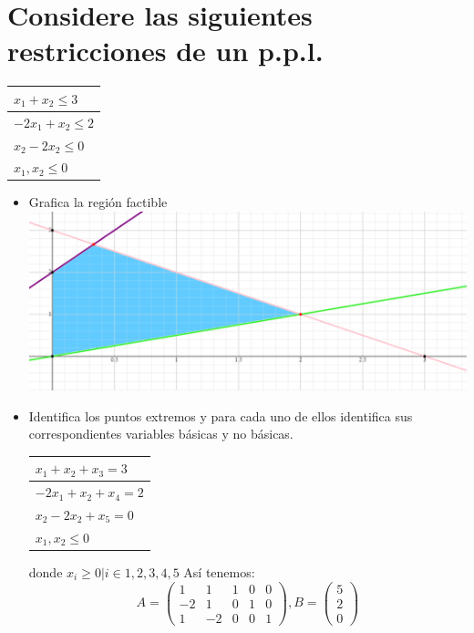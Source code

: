 \section{Considere las siguientes restricciones de un p.p.l.}
\begin{tabular}{|l|}
\hline
$x_1+x_2\leq 3 $  \\ \hline
$-2x_1+x_2\leq 2$ \\ \hline
$x_2-2x_2\leq0$   \\ \hline
$x_1, x_2 \leq 0$ \\ \hline
\end{tabular}

\begin{itemize}
    \item Grafica la región factible\\
    \includegraphics[scale=0.2]{Ejercicios/graficas/Ejercicio1.png}
    
    \item Identifica los puntos extremos y para cada uno de ellos identifica sus correspondientes variables básicas y no básicas.
        \begin{center}
            \begin{tabular}{|l|}
\hline
$x_1+x_2+x_3= 3 $  \\ \hline
$-2x_1+x_2+x_4= 2$ \\ \hline
$x_2-2x_2+x_5=0$   \\ \hline
$x_1, x_2 \leq 0$ \\ \hline
\end{tabular}
        \end{center}
        donde $x_i\geq 0 | i\in {1,2,3,4,5}$
        Así tenemos:
        $$A=\begin{pmatrix}1&1&1&0&0\\ -2&1&0&1&0\\ 1&-2&0&0&1\end{pmatrix}, B=\begin{pmatrix}5\\ 2\\ 0\end{pmatrix}$$
        

\end{itemize}
